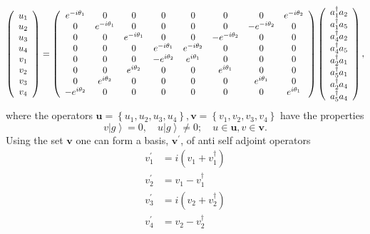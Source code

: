 \documentclass[aps,preprint]{revtex4}%
\begin{document}
\begin{equation}
\left(
\begin{array}
[c]{c}%
u_{1}\\
u_{2}\\
u_{3}\\
u_{4}\\
v_{1}\\
v_{2}\\
v_{3}\\
v_{4}%
\end{array}
\right)  =\left(
\begin{array}
[c]{cccccccc}%
e^{-i\theta_{1}} & 0 & 0 & 0 & 0 & 0 & 0 & e^{-i\theta_{2}}\\
0 & e^{-i\theta_{1}} & 0 & 0 & 0 & 0 & -e^{-i\theta_{2}} & 0\\
0 & 0 & e^{-i\theta_{1}} & 0 & 0 & -e^{-i\theta_{2}} & 0 & 0\\
0 & 0 & 0 & e^{-i\theta_{1}} & e^{-i\theta_{2}} & 0 & 0 & 0\\
0 & 0 & 0 & -e^{i\theta_{2}} & e^{i\theta_{1}} & 0 & 0 & 0\\
0 & 0 & e^{i\theta_{2}} & 0 & 0 & e^{i\theta_{1}} & 0 & 0\\
0 & e^{i\theta_{2}} & 0 & 0 & 0 & 0 & e^{i\theta_{1}} & 0\\
-e^{i\theta_{2}} & 0 & 0 & 0 & 0 & 0 & 0 & e^{i\theta_{1}}%
\end{array}
\right)  \left(
\begin{array}
[c]{c}%
a_{1}^{\dagger}a_{2}\\
a_{1}^{\dagger}a_{5}\\
a_{4}^{\dagger}a_{2}\\
a_{4}^{\dagger}a_{5}\\
a_{2}^{\dagger}a_{1}\\
a_{5}^{\dagger}a_{1}\\
a_{2}^{\dagger}a_{4}\\
a_{5}^{\dagger}a_{4}%
\end{array}
\right)  ,
\end{equation}
where the operators $\boldsymbol{u}=\left\{  u_{1},u_{2},u_{3},u_{4}\right\}
,\boldsymbol{v}=\left\{  v_{1},v_{2},v_{3},v_{4}\right\}  $ have the
properties
\begin{equation}
v\left\vert g\right\rangle =0,\quad u\left\vert g\right\rangle \neq0;\quad
u\in\boldsymbol{u},v\in\boldsymbol{v.}%
\end{equation}
Using the set $\boldsymbol{v}$ one can form a basis, $\boldsymbol{v}^{\prime}%
$, of anti self adjoint operators
\begin{align}
v_{1}^{\prime}  & =i\left(  v_{1}+v_{1}^{\dagger}\right)  \nonumber\\
v_{2}^{\prime}  & =v_{1}-v_{1}^{\dagger}\nonumber\\
v_{3}^{\prime}  & =i\left(  v_{2}+v_{2}^{\dagger}\right)  \nonumber\\
v_{4}^{\prime}  & =v_{2}-v_{2}^{\dagger}%
\end{align}
\end{document}
